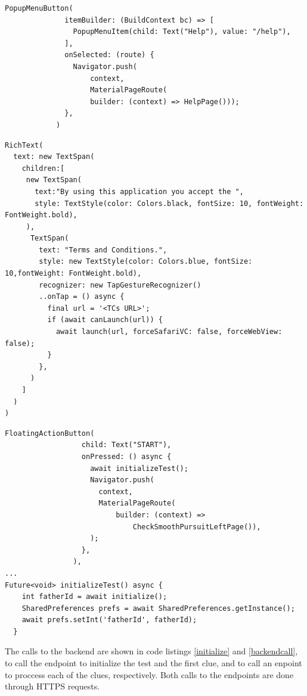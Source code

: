 \begin{lstlisting}[language=flutter, basicstyle=\small, caption={Popup menu button code}, captionpos=b, label={popupcode}]
PopupMenuButton(
              itemBuilder: (BuildContext bc) => [
                PopupMenuItem(child: Text("Help"), value: "/help"),
              ],
              onSelected: (route) {
                Navigator.push(
                    context,
                    MaterialPageRoute(
                    builder: (context) => HelpPage()));
              },
            )
\end{lstlisting}


\begin{lstlisting}[language=flutter, basicstyle=\small, caption={Terms and Conditions document link}, captionpos=b, label={termsandconds}]
RichText(
  text: new TextSpan(
    children:[
     new TextSpan(
       text:"By using this application you accept the ",
       style: TextStyle(color: Colors.black, fontSize: 10, fontWeight: FontWeight.bold),
     ),
      TextSpan(
        text: "Terms and Conditions.",
        style: new TextStyle(color: Colors.blue, fontSize: 10,fontWeight: FontWeight.bold),
        recognizer: new TapGestureRecognizer()
        ..onTap = () async {
          final url = '<TCs URL>';
          if (await canLaunch(url)) {
            await launch(url, forceSafariVC: false, forceWebView: false);
          }
        },
      )
    ]
  )
)
\end{lstlisting}

\begin{lstlisting}[language=flutter, basicstyle=\small, label={startbutton}, caption={Code to call backend to initialize test and first clue}, captionpos=b]
FloatingActionButton(
                  child: Text("START"),
                  onPressed: () async {
                    await initializeTest();
                    Navigator.push(
                      context,
                      MaterialPageRoute(
                          builder: (context) =>
                              CheckSmoothPursuitLeftPage()),
                    );
                  },
                ),
...
Future<void> initializeTest() async {
    int fatherId = await initialize();
    SharedPreferences prefs = await SharedPreferences.getInstance();
    await prefs.setInt('fatherId', fatherId);
  }
\end{lstlisting}



The calls to the backend are shown in code listings \ref{initialize} and \ref{backendcall}, to call the endpoint to initialize the test and the first clue, and to call an enpoint to proccess each of the clues, respectively. Both calls to the endpoints are done through HTTPS requests.

